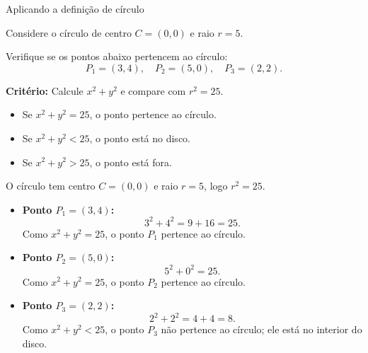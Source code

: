 \documentclass[9pt]{beamer}
\begin{document}
\begin{frame}{Aplicando a definição de círculo }

Considere o círculo de centro \( C = (0,0) \) e raio \( r = 5 \).

Verifique se os pontos abaixo pertencem ao círculo:
\[
P_1 = (3,4), \quad P_2 = (5,0), \quad P_3 = (2,2).
\]

\textbf{Critério:}  
Calcule \( x^2 + y^2 \) e compare com \( r^2 = 25 \).

\begin{itemize}
\item Se \( x^2 + y^2 = 25 \), o ponto pertence ao círculo.
\item Se \( x^2 + y^2 < 25 \), o ponto está no disco.
\item Se \( x^2 + y^2 > 25 \), o ponto está fora.
\end{itemize}
    \pause


O círculo tem centro \( C = (0,0) \) e raio \( r = 5 \), logo \( r^2 = 25 \).

\begin{itemize}
\item \textbf{Ponto \( P_1 = (3,4) \):}
\[
3^2 + 4^2 = 9 + 16 = 25.
\]
Como \( x^2 + y^2 = 25 \), o ponto \( P_1 \) pertence ao círculo.

\item \textbf{Ponto \( P_2 = (5,0) \):}
\[
5^2 + 0^2 = 25.
\]
Como \( x^2 + y^2 = 25 \), o ponto \( P_2 \) pertence ao círculo.

\item \textbf{Ponto \( P_3 = (2,2) \):}
\[
2^2 + 2^2 = 4 + 4 = 8.
\]
Como \( x^2 + y^2 < 25 \), o ponto \( P_3 \) não pertence ao círculo; ele está no interior do disco.
\end{itemize}

\end{frame}
\end{document}
